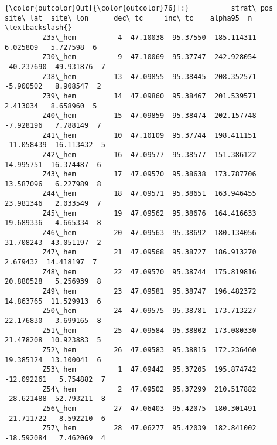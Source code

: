 \documentclass[11pt]{article}
\begin{document}
            \begin{Verbatim}[commandchars=\\\{\}]
{\color{outcolor}Out[{\color{outcolor}76}]:}          strat\_pos  site\_lat  site\_lon      dec\_tc     inc\_tc    alpha95  n  \textbackslash{}
         Z35\_hem          4  47.10038  95.37550  185.114311   6.025809   5.727598  6   
         Z30\_hem          9  47.10069  95.37747  242.928054 -40.237690  49.931876  7   
         Z38\_hem         13  47.09855  95.38445  208.352571  -5.900502   8.908547  2   
         Z39\_hem         14  47.09860  95.38467  201.539571   2.413034   8.658960  5   
         Z40\_hem         15  47.09859  95.38474  202.157748  -7.928196   7.788149  7   
         Z41\_hem         10  47.10109  95.37744  198.411151 -11.058439  16.113432  5   
         Z42\_hem         16  47.09577  95.38577  151.386122  14.995751  16.374487  6   
         Z43\_hem         17  47.09570  95.38638  173.787706  13.587096   6.227989  8   
         Z44\_hem         18  47.09571  95.38651  163.946455  23.981346   2.033549  7   
         Z45\_hem         19  47.09562  95.38676  164.416633  19.689336   4.665334  8   
         Z46\_hem         20  47.09563  95.38692  180.134056  31.708243  43.051197  2   
         Z47\_hem         21  47.09568  95.38727  186.913270   2.679432  14.418197  7   
         Z48\_hem         22  47.09570  95.38744  175.819816  20.880528   5.256939  8   
         Z49\_hem         23  47.09581  95.38747  196.482372  14.863765  11.529913  6   
         Z50\_hem         24  47.09575  95.38781  173.713227  22.176830   3.699165  8   
         Z51\_hem         25  47.09584  95.38802  173.080330  21.478208  10.923883  5   
         Z52\_hem         26  47.09583  95.38815  172.236460  19.385124  13.100041  6   
         Z53\_hem          1  47.09442  95.37205  195.874742 -12.092261   5.754882  7   
         Z54\_hem          2  47.09502  95.37299  210.517882 -28.621488  52.793211  8   
         Z56\_hem         27  47.06403  95.42075  180.301491 -21.711722   8.592210  6   
         Z57\_hem         28  47.06277  95.42039  182.841002 -18.592084   7.462069  4   
         

\end{Verbatim}
\end{document}
